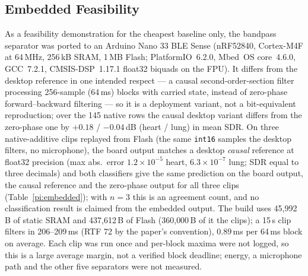 \documentclass[journal]{IEEEtran}
\begin{document}
\subsection{Embedded Feasibility}
\label{sec:embedded}

As a feasibility demonstration for the cheapest baseline only, the bandpass separator was ported to an Arduino Nano 33 BLE Sense (nRF52840, Cortex-M4F at 64\,MHz, 256\,kB SRAM, 1\,MB Flash; PlatformIO~6.2.0, Mbed~OS core~4.6.0, GCC~7.2.1, CMSIS-DSP~1.17.1 float32 biquads on the FPU). It differs from the desktop reference in one intended respect --- a causal second-order-section filter processing 256-sample (64\,ms) blocks with carried state, instead of zero-phase forward--backward filtering --- so it is a deployment variant, not a bit-equivalent reproduction; over the 145 native rows the causal desktop variant differs from the zero-phase one by $+0.18$ / $-0.04$\,dB (heart / lung) in mean SDR. On three native-additive clips replayed from Flash (the same \texttt{int16} samples the desktop filters, no microphone), the board output matches a desktop \emph{causal} reference at float32 precision (max abs.\ error $1.2\times10^{-5}$ heart, $6.3\times10^{-7}$ lung; SDR equal to three decimals) and both classifiers give the same prediction on the board output, the causal reference and the zero-phase output for all three clips (Table~\ref{pi:embedded}); with $n{=}3$ this is an agreement count, and no classification result is claimed from the embedded output. The build uses 45{,}992\,B of static SRAM and 437{,}612\,B of Flash (360{,}000\,B of it the clips); a 15\,s clip filters in 206--209\,ms (RTF 72 by the paper's convention), $0.89$\,ms per 64\,ms block on average. Each clip was run once and per-block maxima were not logged, so this is a large average margin, not a verified block deadline; energy, a microphone path and the other five separators were not measured.
\end{document}
